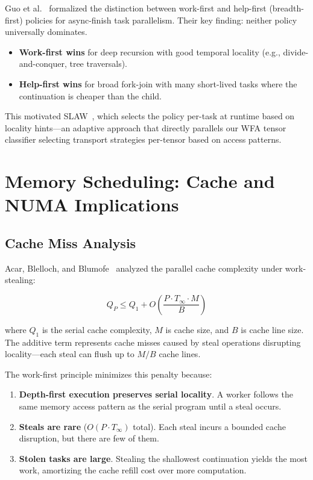 \documentclass[11pt,letterpaper]{article}
\begin{document}
Guo et al.~\cite{guo2009workfirst} formalized the distinction between work-first and help-first (breadth-first) policies for async-finish task parallelism. Their key finding: neither policy universally dominates.

\begin{itemize}
    \item \textbf{Work-first wins} for deep recursion with good temporal locality (e.g., divide-and-conquer, tree traversals).
    \item \textbf{Help-first wins} for broad fork-join with many short-lived tasks where the continuation is cheaper than the child.
\end{itemize}

This motivated SLAW~\cite{guo2010slaw}, which selects the policy per-task at runtime based on locality hints---an adaptive approach that directly parallels our WFA tensor classifier selecting transport strategies per-tensor based on access patterns.

\section{Memory Scheduling: Cache and NUMA Implications}
\label{sec:memory}

\subsection{Cache Miss Analysis}

Acar, Blelloch, and Blumofe~\cite{acar2002locality} analyzed the parallel cache complexity under work-stealing:

\begin{equation}
    Q_P \leq Q_1 + O\!\left(\frac{P \cdot T_\infty \cdot M}{B}\right)
    \label{eq:cachemiss}
\end{equation}

where $Q_1$ is the serial cache complexity, $M$ is cache size, and $B$ is cache line size. The additive term represents cache misses caused by steal operations disrupting locality---each steal can flush up to $M/B$ cache lines.

The work-first principle minimizes this penalty because:

\begin{enumerate}
    \item \textbf{Depth-first execution preserves serial locality}. A worker follows the same memory access pattern as the serial program until a steal occurs.
    \item \textbf{Steals are rare} ($O(P \cdot T_\infty)$ total). Each steal incurs a bounded cache disruption, but there are few of them.
    \item \textbf{Stolen tasks are large}. Stealing the shallowest continuation yields the most work, amortizing the cache refill cost over more computation.
\end{enumerate}
\end{document}

